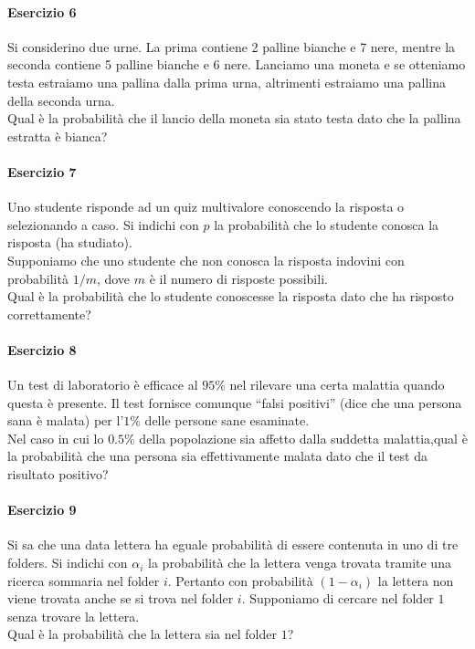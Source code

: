 \documentclass[12pt]{article}
\begin{document}
    \paragraph{Esercizio 6}
    Si considerino due urne. La prima contiene 2 palline bianche e 7 nere, mentre la seconda contiene 5 palline bianche e 6 nere. Lanciamo una moneta e se otteniamo testa estraiamo una pallina dalla prima urna, altrimenti estraiamo una pallina della seconda urna.
    \\Qual è la probabilità che il lancio della moneta sia stato testa dato che la pallina estratta è bianca?
    \paragraph{Esercizio 7}
    Uno studente risponde ad un quiz multivalore conoscendo la risposta o selezionando a caso. Si indichi con $p$ la probabilità che lo studente conosca la risposta (ha studiato).
    \\Supponiamo che uno studente che non conosca la risposta indovini con probabilità $1/m$, dove $m$ è il numero di risposte possibili.
    \\Qual è la probabilità che lo studente conoscesse la risposta dato che ha risposto correttamente?
    \paragraph{Esercizio 8}
    Un test di laboratorio è efficace al $95\%$ nel rilevare una certa malattia quando questa è presente. Il test fornisce comunque “falsi positivi” (dice che una persona sana è malata) per l’$1\%$ delle persone sane esaminate.
    \\Nel caso in cui lo $0.5\%$ della popolazione sia affetto dalla suddetta malattia,qual è la probabilità che una persona sia effettivamente malata dato che il test da risultato positivo?
    \newpage
    \paragraph{Esercizio 9}
    Si sa che una data lettera ha eguale probabilità di essere contenuta in uno di tre folders. Si indichi con $\alpha _i$ la probabilità che la lettera venga trovata tramite una ricerca sommaria nel folder $i$. Pertanto con probabilità $(1- \alpha _i)$ la lettera non viene trovata anche se si trova nel folder $i$. Supponiamo di cercare nel folder $1$ senza trovare la lettera.
    \\Qual è la probabilità che la lettera sia nel folder $1$?
\end{document}
